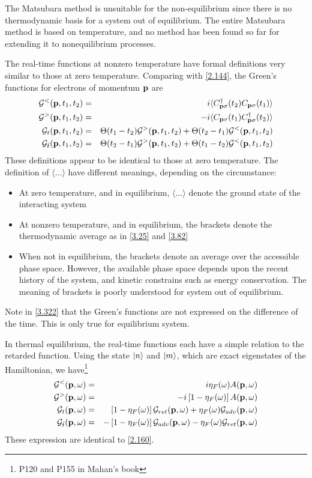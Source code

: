 The Matsubara method is unsuitable for the non-equilibrium since there is no thermodynamic basis for a system out of equilibrium.
The entire Matsubara method is based on temperature, and no method has been found so far for extending it to nonequilibrium processes.

The real-time functions at nonzero temperature have formal definitions very similar to those at zero temperature.
Comparing with \eqref{2.144}, the Green's functions for electrons of momentum $\mathbf{p}$ are
\begin{eqnarray}
    \mathcal{G}^<(\mathbf{p},t_1,t_2) &=& i\langle C^\dagger_{\mathbf{p}\sigma}(t_2) C_{\mathbf{p}\sigma}(t_1) \rangle \nonumber \\
    \mathcal{G}^>(\mathbf{p},t_1,t_2) &=& -i\langle C_{\mathbf{p}\sigma}(t_1) C_{\mathbf{p}\sigma}^\dagger(t_2) \rangle \nonumber \\
    \mathcal{G}_t(\mathbf{p},t_1,t_2) &=& \Theta(t_1-t_2) \mathcal{G}^>(\mathbf{p},t_1,t_2) + \Theta(t_2-t_1) \mathcal{G}^<(\mathbf{p},t_1,t_2) \nonumber \\
    \mathcal{G}_{\bar{t}}(\mathbf{p},t_1,t_2) &=& \Theta(t_2-t_1) \mathcal{G}^>(\mathbf{p},t_1,t_2) + \Theta(t_1-t_2) \mathcal{G}^<(\mathbf{p},t_1,t_2)  \label{3.322}
\end{eqnarray}
These definitions appear to be identical to those at zero temperature.
The definition of $\langle \dots \rangle$ have different meanings, depending on the circumstance:
\begin{itemize}
    \item At zero temperature, and in equilibrium, $\langle \dots \rangle$ denote the ground state of the interacting system
    \item At nonzero temperature, and in equilibrium, the brackets denote the thermodynamic average as in \eqref{3.25} and \eqref{3.82}
    \item When not in equilibrium, the brackets denote an average over the accessible phase space. However, the available phase space depends upon the recent history of the system, and kinetic constrains such as energy conservation. The meaning of brackets is poorly understood for system out of equilibrium.
\end{itemize}
Note in \eqref{3.322} that the Green's functions are not expressed on the difference of the time.
This is only true for equilibrium system.

In thermal equilibrium, the real-time functions each have a simple relation to the retarded function.
Using the state $\ket{n}$ and $\ket{m}$, which are exact eigenstates of the Hamiltonian, we have\footnote{P120 and P155 in Mahan's book}
\begin{eqnarray}
    \mathcal{G}^<(\mathbf{p},\omega) &=& i\eta_F(\omega) A(\mathbf{p},\omega) \label{3.325} \\
    \mathcal{G}^>(\mathbf{p},\omega) &=& - i \left[ 1-\eta_F(\omega) \right] A(\mathbf{p},\omega) \label{3.326} \\
    \mathcal{G}_t(\mathbf{p},\omega) &=& \left[ 1-\eta_F(\omega)\right] \mathcal{G}_{ret}(\mathbf{p},\omega) + \eta_F(\omega) \mathcal{G}_{adv}(\mathbf{p},\omega) \label{3.327} \\
    \mathcal{G}_{\bar{t}} (\mathbf{p},\omega) &=& -\left[1-\eta_F(\omega)\right] \mathcal{G}_{adv}(\mathbf{p},\omega) - \eta_F(\omega) \mathcal{G}_{ret}(\mathbf{p},\omega) \label{3.328}
\end{eqnarray}
These expression are identical to \eqref{2.160}.

